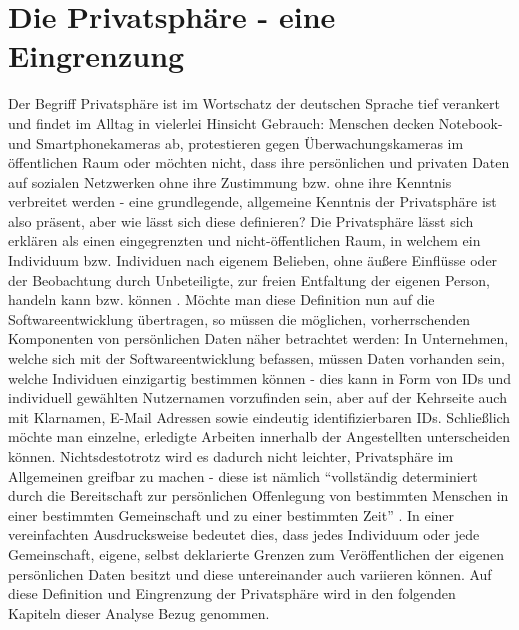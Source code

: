 \section{Die Privatsphäre - eine Eingrenzung}
Der Begriff Privatsphäre ist im Wortschatz der deutschen Sprache tief verankert und findet im Alltag in vielerlei Hinsicht Gebrauch: Menschen decken Notebook- und Smartphonekameras
ab, protestieren gegen Überwachungskameras im öffentlichen Raum \cite{Stallwood:2013aa} oder möchten nicht, dass ihre persönlichen und privaten Daten auf sozialen Netzwerken ohne ihre Zustimmung
bzw. ohne ihre Kenntnis verbreitet werden \cite{Picchi:2018aa} - eine grundlegende, allgemeine Kenntnis der Privatsphäre ist also präsent, aber wie lässt sich diese definieren? \newline
Die Privatsphäre lässt sich erklären als einen eingegrenzten und nicht-öffentlichen Raum, in welchem ein Individuum bzw. Individuen nach eigenem Belieben, ohne äußere Einflüsse oder der Beobachtung durch
Unbeteiligte, zur freien Entfaltung der eigenen Person, handeln kann bzw. können \cite*{Pettinger:2020aa}. Möchte man diese Definition nun auf die Softwareentwicklung übertragen, so müssen die möglichen, 
vorherrschenden Komponenten von persönlichen Daten näher betrachtet werden: In Unternehmen, welche sich mit der Softwareentwicklung befassen, müssen Daten vorhanden sein, welche Individuen einzigartig 
bestimmen können - dies kann in Form von IDs und individuell gewählten Nutzernamen vorzufinden sein, aber auf der Kehrseite auch mit Klarnamen, E-Mail Adressen sowie eindeutig identifizierbaren IDs. Schließlich 
möchte man einzelne, erledigte Arbeiten innerhalb der Angestellten unterscheiden können. \newline
Nichtsdestotrotz wird es dadurch nicht leichter, Privatsphäre im Allgemeinen greifbar zu machen - diese ist nämlich \enquote{vollständig determiniert durch die Bereitschaft zur persönlichen Offenlegung von bestimmten Menschen in einer
bestimmten Gemeinschaft und zu einer bestimmten Zeit} \cite{Miller:2000aa}. In einer vereinfachten Ausdrucksweise bedeutet dies, dass jedes Individuum oder jede Gemeinschaft, eigene, selbst deklarierte Grenzen zum Veröffentlichen
der eigenen persönlichen Daten besitzt und diese untereinander auch variieren können. \newline
Auf diese Definition und Eingrenzung der Privatsphäre wird in den folgenden Kapiteln dieser Analyse Bezug genommen.

